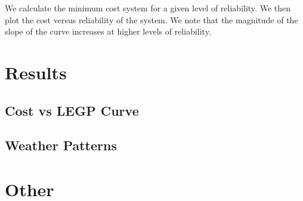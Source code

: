 \documentclass{article}
\begin{document}
We calculate the minimum cost system for a given level of reliability.
We then plot the cost versus reliability of the system.
We note that the magnitude of the slope of the curve increases at higher
levels of reliability.


\section{Results}
\subsection{Cost vs LEGP Curve}
\subsection{Weather Patterns}


\section{}

\section{Other}
\end{document}
